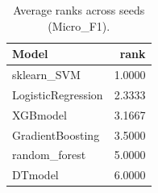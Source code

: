 \begin{table}[t]
\centering
\begin{tabular}{lr}
\toprule
Model & rank \\
\midrule
sklearn_SVM & 1.0000 \\
LogisticRegression & 2.3333 \\
XGBmodel & 3.1667 \\
GradientBoosting & 3.5000 \\
random_forest & 5.0000 \\
DTmodel & 6.0000 \\
\bottomrule
\end{tabular}
\caption{Average ranks across seeds (Micro_F1).}
\label{tab:avg_rank_Micro_F1}
\end{table}